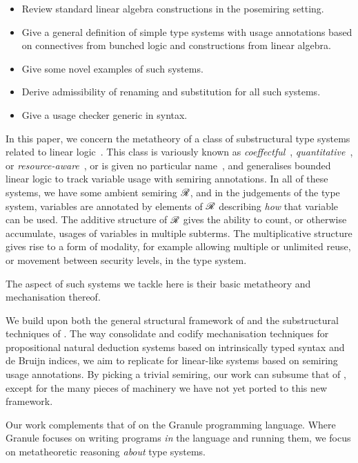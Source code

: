 \begin{itemize}
  \item Review standard linear algebra constructions in the posemiring setting.
  \item Give a general definition of simple type systems with usage annotations
    based on connectives from bunched logic and constructions from linear
    algebra.
  \item Give some novel examples of such systems.
  \item Derive admissibility of renaming and substitution for all such systems.
  \item Give a usage checker generic in syntax.
\end{itemize}

In this paper, we concern the metatheory of a class of substructural type
systems related to linear logic~\cite{girard87linear}.
This class is variously known as
\emph{coeffectful}~\cite{PetricekOM14,Granule18},
\emph{quantitative}~\cite{BrunelGMZ14,Atkey18}, or
\emph{resource-aware}~\cite{GhicaS14},
or is given no particular name~\cite{reed10distance,abadi99core},
and generalises bounded linear logic to track variable usage with semiring
annotations.
In all of these systems, we have some ambient semiring $\mathscr R$, and in the
judgements of the type system, variables are annotated by elements of $\mathscr R$
describing \emph{how} that variable can be used.
The additive structure of $\mathscr R$ gives the ability to count, or otherwise
accumulate, usages of variables in multiple subterms.
The multiplicative structure gives rise to a form of modality, for example
allowing multiple or unlimited reuse, or movement between security levels, in
the type system.

The aspect of such systems we tackle here is their basic metatheory and
mechanisation thereof.

We build upon both the general structural framework of
\citet{AACMM20} and the substructural techniques of \citet{WA20}.
The way \citeauthor{AACMM20} consolidate and codify mechanisation techniques for
propositional natural deduction systems based on intrinsically typed syntax and
de Bruijn indices, we aim to replicate for linear-like systems based on
semiring usage annotations.
By picking a trivial semiring, our work can subsume that of
\citeauthor{AACMM20}, except for the many pieces of machinery we have not yet
ported to this new framework.

Our work complements that of \citet{Granule18} on the Granule programming
language.
Where Granule focuses on writing programs \emph{in} the language and running
them, we focus on metatheoretic reasoning \emph{about} type systems.


